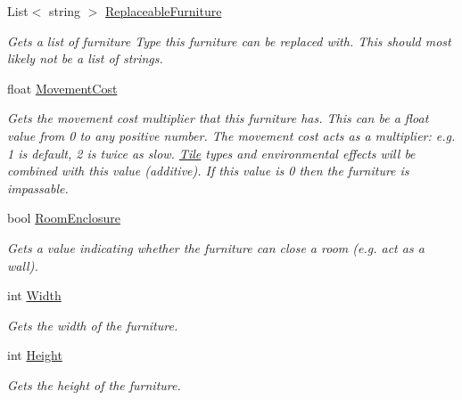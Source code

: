 \begin{DoxyCompactItemize}
List$<$ string $>$ \hyperlink{class_furniture_a02d901fd13537cfeaafbae655c42391d}{Replaceable\+Furniture}
\begin{DoxyCompactList}\small\item\em Gets a list of furniture Type this furniture can be replaced with. This should most likely not be a list of strings. \end{DoxyCompactList}\item 
float \hyperlink{class_furniture_a3265b21652e2bc4c43131e8fe0b9c23f}{Movement\+Cost}
\begin{DoxyCompactList}\small\item\em Gets the movement cost multiplier that this furniture has. This can be a float value from 0 to any positive number. The movement cost acts as a multiplier\+: e.\+g. 1 is default, 2 is twice as slow. \hyperlink{class_tile}{Tile} types and environmental effects will be combined with this value (additive). If this value is \textquotesingle{}0\textquotesingle{} then the furniture is impassable. \end{DoxyCompactList}\item 
bool \hyperlink{class_furniture_a7672062c7a01115a8010681ef06fa42a}{Room\+Enclosure}
\begin{DoxyCompactList}\small\item\em Gets a value indicating whether the furniture can close a room (e.\+g. act as a wall). \end{DoxyCompactList}\item 
int \hyperlink{class_furniture_ae25de1a4dc2d70f8f8ab39a66aff60c2}{Width}
\begin{DoxyCompactList}\small\item\em Gets the width of the furniture. \end{DoxyCompactList}\item 
int \hyperlink{class_furniture_a1d0f0137f064f6231b3eeca83dc1e843}{Height}
\begin{DoxyCompactList}\small\item\em Gets the height of the furniture. \end{DoxyCompactList}\item 

\end{DoxyCompactItemize}
